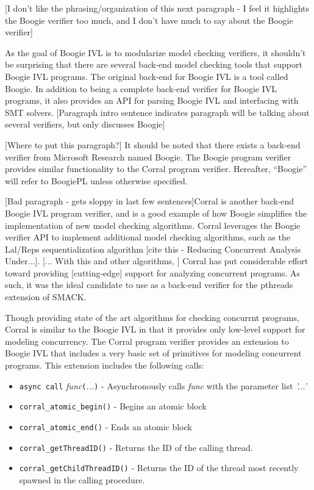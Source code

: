 [I don't like the phrasing/organization of this next paragraph - I feel it highlights the Boogie verifier too much, and I don't have much to say about the Boogie verifier]

As the goal of Boogie IVL is to modularize model checking verifiers, it shouldn't be surprising that there are several back-end model checking tools that support Boogie IVL programs.  The original back-end for Boogie IVL is a tool called Boogie.  In addition to being a complete back-end verifier for Boogie IVL programs, it also provides an API for parsing Boogie IVL and interfacing with SMT solvers.  [Paragraph intro sentence indicates paragraph will be talking about several verifiers, but only discusses Boogie]

[Where to put this paragraph?] It should be noted that there exists a back-end verifier from Microsoft Research named Boogie.  The Boogie program verifier provides similar functionality to the Corral program verifier.  Hereafter, ``Boogie'' will refer to BoogiePL unless otherwise specified.

[Bad paragraph - gets sloppy in last few sentences]Corral is another back-end Boogie IVL program verifier, and is a good example of how Boogie simplifies the implementation of new model checking algorithms.  Corral leverages the Boogie verifier API to implement additional model checking algorithms, such as the Lal/Reps sequentialization algorithm [cite this - Reducing Concurrent Analysis Under...].  [... With this and other algorithms, ] Corral has put considerable effort toward providing [cutting-edge] support for analyzing concurrent programs.  As such, it was the ideal candidate to use as a back-end verifier for the pthreads extension of SMACK.

Though providing state of the art algorithms for checking concurrnt programs, Corral is similar to the Boogie IVL in that it provides only low-level support for modeling concurrency.  The Corral program verifier provides an extension to Boogie IVL that includes a very basic set of primitives for modeling concurrent programs.  This extension includes the following calls:

\begin{itemize}
\item \lstinline|async call| \emph{func}\lstinline|(|\emph{...}\lstinline|)| - Asynchronously calls \emph{func} with the parameter list \emph{'...'}
\item \lstinline|corral_atomic_begin()| - Begins an atomic block
\item \lstinline|corral_atomic_end()| - Ends an atomic block
\item \lstinline|corral_getThreadID()| - Returns the ID of the calling thread.
\item \lstinline|corral_getChildThreadID()| - Returns the ID of the thread most recently spawned in the calling procedure.
\end{itemize}

